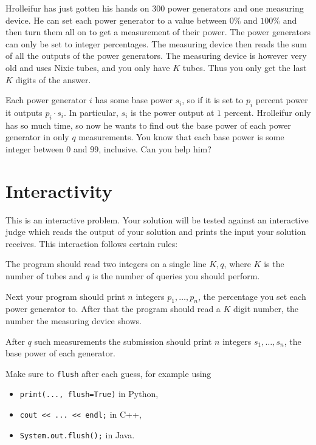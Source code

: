 
Hrolleifur has just gotten his hands on $300$ power generators and one measuring device. He can set each power generator to a value between $0\%$ and $100\%$ and
then turn them all on to get a measurement of their power. The power generators can only be set to integer percentages. The measuring device then
reads the sum of all the outputs of the power generators. The measuring device is however very old and uses Nixie tubes, and you only have $K$
tubes. Thus you only get the last $K$ digits of the answer.

Each power generator $i$ has some base power $s_i$, so if it is set to $p_i$ percent power it outputs $p_i \cdot s_i$.
In particular, $s_i$ is the power output at $1$ percent.
Hrolleifur only has so much time, so now he wants to find out the base power of each power generator in only $q$ measurements.
You know that each base power is some integer between $0$ and $99$, inclusive.
Can you help him?

\section*{Interactivity}
This is an interactive problem. Your solution will be tested against an interactive
judge which reads the output of your solution and prints the input your solution
receives. This interaction follows certain rules:

The program should read two integers on a single line $K, q$, where $K$ is the number of tubes and $q$ is the number of queries you should perform.

Next your program should print $n$ integers $p_1, \dots, p_n$, the percentage you set each power generator to. 
After that the program should read a $K$ digit number, the number the measuring device shows.

After $q$ such measurements the submission should print $n$ integers $s_1, \dots, s_n$, the base power of each generator.

Make sure to \texttt{flush} after each guess, for example using
\begin{itemize}
    \item \texttt{print(..., flush=True)} in Python,
    \item \texttt{cout << ... << endl;} in C++,
    \item \texttt{System.out.flush();} in Java.
\end{itemize}

